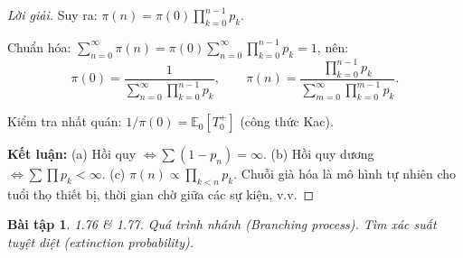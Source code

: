 \documentclass[8pt,a4paper]{article}
\newtheorem{exercise}{Bài tập}
\newenvironment{solution}{\begin{proof}[Lời giải]}{\end{proof}}
\newcommand{\E}{\mathbb{E}}
\begin{document}
\begin{solution}
Suy ra: $\pi(n) = \pi(0) \prod_{k=0}^{n-1} p_k$.

Chuẩn hóa: $\sum_{n=0}^{\infty} \pi(n) = \pi(0) \sum_{n=0}^{\infty} \prod_{k=0}^{n-1} p_k = 1$, nên:
\[
  \boxed{\pi(0) = \frac{1}{\sum_{n=0}^{\infty} \prod_{k=0}^{n-1} p_k}, \qquad \pi(n) = \frac{\prod_{k=0}^{n-1} p_k}{\sum_{m=0}^{\infty} \prod_{k=0}^{m-1} p_k}}.
\]

Kiểm tra nhất quán: $1/\pi(0) = \E_0[T_0^+]$ (công thức Kac). \checkmark

\textbf{Kết luận:} (a) Hồi quy $\iff \sum(1-p_n) = \infty$. (b) Hồi quy dương $\iff \sum \prod p_k < \infty$. (c) $\pi(n) \propto \prod_{k<n} p_k$. Chuỗi già hóa là mô hình tự nhiên cho tuổi thọ thiết bị, thời gian chờ giữa các sự kiện, v.v.
\end{solution}

\begin{exercise}
1.76 \& 1.77. Quá trình nhánh (Branching process). Tìm xác suất tuyệt diệt (extinction probability).
\end{exercise}
\end{document}
